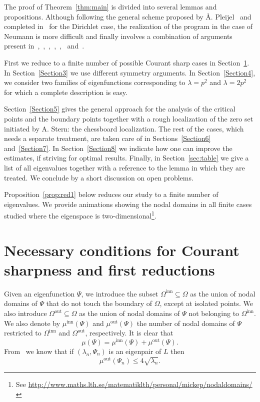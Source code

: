 \documentclass[a4paper,reqno,11pt]{amsart}
\theoremstyle{remark}
\theoremstyle{definition}
\numberwithin{equation}{section}
\begin{document}
The proof of Theorem~\ref{thm:main} is divided into several lemmas and 
propositions. Although following the general scheme proposed by 
\AA. Pleijel~\cite{Pl} and completed in~\cite{BH} for the Dirichlet case, the 
realization of the program in the case of Neumann is more difficult and finally 
involves a combination of arguments present 
in~\cite{Pl},~\cite{St},~\cite{Ley0},~\cite{Ley},~\cite{HHOT},~\cite{HH} and~\cite{BH}.

First we reduce to a finite number of possible Courant sharp cases in 
Section~\ref{Section2}. In Section~\ref{Section3} we use different symmetry
arguments. In Section~\ref{Section4}, we consider two families of eigenfunctions 
corresponding to $\lambda = p^2$ and $\lambda = 2 p^2$ for which a complete 
description is easy.

Section~\ref{Section5} gives the general approach for the analysis of the 
critical points and the boundary points together with a rough localization of 
the zero set initiated by A. Stern: the chessboard localization. The rest of the 
cases, which needs a separate treatment, are taken 
care of in Sections~\ref{Section6} and~\ref{Section7}. In Section~\ref{Section8} 
we indicate 
how one can improve the estimates, if striving for optimal results. Finally,
in Section~\ref{sec:table} we give a list of all eigenvalues together with a
reference to the lemma in which they are treated. We conclude by a short 
discussion on open problems.

Proposition~\ref{prop:red1} below reduces our study to a finite number of
eigenvalues. We provide animations showing the nodal domains in all finite cases studied where the eigenspace is two-dimensional\footnote{See \url{http://www.maths.lth.se/matematiklth/personal/mickep/nodaldomains/}}.

\section{Necessary conditions for Courant sharpness and first reductions}
\label{Section2}
Given an eigenfunction $\Psi$, we introduce the subset 
$\Omega^{\text{inn}}\subseteq\Omega$ as the union of nodal domains of $\Psi$
that do not touch the boundary of $\Omega$, except at isolated points. We also
introduce $\Omega^{\text{out}}\subseteq\Omega$ as the union of nodal domains of 
$\Psi$ not belonging to $\Omega^{\text{inn}}$. We also denote by 
$\mu^{\text{inn}}(\Psi)$ and $\mu^{\text{out}}(\Psi)$ the number of 
nodal domains of $\Psi$ restricted to $\Omega^{\text{inn}}$ and 
$\Omega^{\text{out}}$, respectively. It is clear that
\[
\mu(\Psi)=\mu^{\text{inn}}(\Psi)+\mu^{\text{out}}(\Psi).
\]
From~\cite{Pl} we know that if $(\lambda_n,\Psi_n)$ is an eigenpair of $L$ then
\begin{equation}
\label{eq:muout}
\mu^{\text{out}}(\Psi_n)\leq 4\sqrt{\lambda_n}.
\end{equation}
\end{document}
